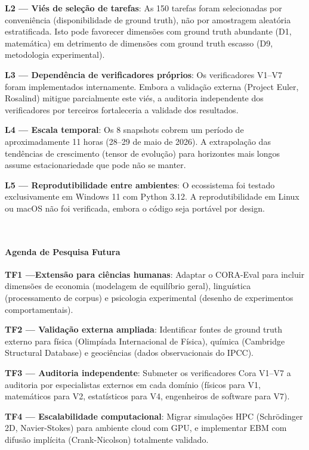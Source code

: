 \textbf{L2 — Viés de seleção de tarefas}: As 150 tarefas foram selecionadas
por conveniência (disponibilidade de ground truth), não por amostragem
aleatória estratificada. Isto pode favorecer dimensões com ground truth
abundante (D1, matemática) em detrimento de dimensões com ground truth escasso
(D9, metodologia experimental).

\textbf{L3 — Dependência de verificadores próprios}: Os verificadores V1--V7
foram implementados internamente. Embora a validação externa (Project Euler,
Rosalind) mitigue parcialmente este viés, a auditoria independente dos
verificadores por terceiros fortaleceria a validade dos resultados.

\textbf{L4 — Escala temporal}: Os 8 snapshots cobrem um período de
aproximadamente 11 horas (28--29 de maio de 2026). A extrapolação das
tendências de crescimento (tensor de evolução) para horizontes mais longos
assume estacionariedade que pode não se manter.

\textbf{L5 — Reprodutibilidade entre ambientes}: O ecossistema foi testado
exclusivamente em Windows 11 com Python 3.12. A reprodutibilidade em Linux
ou macOS não foi verificada, embora o código seja portável por design.

\\\paragraph{Agenda de Pesquisa Futura}

\textbf{TF1 —Extensão para ciências humanas}: Adaptar o CORA-Eval para incluir
dimensões de economia (modelagem de equilíbrio geral), linguística
(processamento de corpus) e psicologia experimental (desenho de experimentos
comportamentais).

\textbf{TF2 — Validação externa ampliada}: Identificar fontes de ground truth
externo para física (Olimpíada Internacional de Física), química (Cambridge
Structural Database) e geociências (dados observacionais do IPCC).

\textbf{TF3 — Auditoria independente}: Submeter os verificadores Cora V1--V7
a auditoria por especialistas externos em cada domínio (físicos para V1,
matemáticos para V2, estatísticos para V4, engenheiros de software para V7).

\textbf{TF4 — Escalabilidade computacional}: Migrar simulações HPC (Schrödinger
2D, Navier-Stokes) para ambiente cloud com GPU, e implementar EBM com difusão
implícita (Crank-Nicolson) totalmente validado.

